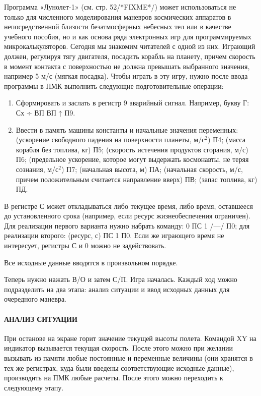 \documentclass[11pt,a4paper,oneside]{article}
\begin{document}
Программа «Лунолет-1» (см. стр. 52/*FIXME*/) может использоваться не только для численного моделирования маневров космических аппаратов в непосредственной близости безатмосферных небесных тел или в качестве учебного пособия, но и как основа ряда электронных игр для программируемых микрокалькуляторов. Сегодня мы знакомим читателей с одной из них. Играющий должен, регулируя тягу двигателя, посадить корабль на планету, причем скорость в момент контакта с поверхностью не должна превышать выбранного значения, например 5 м/с (мягкая посадка). Чтобы играть в эту игру, нужно после ввода программы в ПМК выполнить следующие подготовительные операции:
\begin{enumerate}
\item Сформировать и заслать в регистр 9 аварийный сигнал. Например, букву Г: Сх ÷ ВП ВП ↑ П9.
\item Ввести в память машины константы и начальные значения переменных: (ускорение свободного падения на поверхности планеты, м/с$^{2}$) П4; (масса корабля без топлива, кг) П5; (скорость истечения продуктов сгорания, м/с) П6; (предельное ускорение, которое могут выдержать космонавты, не теряя сознания, м/с$^{2}$) П7; (начальная высота, м) ПА; (начальная скорость, м/с, причем положительным считается направление вверх) ПВ; (запас топлива, кг) ПД.
\end{enumerate}

В регистре С может откладываться либо текущее время, либо время, оставшееся до установленного срока (например, если ресурс жизнеобеспечения ограничен). Для реализации первого варианта нужно набрать команду: 0 ПС 1 /—/ П0; для реализации второго: (ресурс, с) ПС 1 П0. Если же играющего время не интересует, регистры С и 0 можно не задействовать.

Все исходные данные вводятся в произвольном порядке.

Теперь нужно нажать В/О и затем С/П. Игра началась. Каждый ход можно подразделить на два этапа: анализ ситуации и ввод исходных данных для очередного маневра.

\paragraph{АНАЛИЗ СИТУАЦИИ}
При останове на экране горит значение текущей высоты полета. Командой XY на индикатор вызывается текущая скорость. После этого можно при желании вызывать из памяти любые постоянные и переменные величины (они хранятся в тех же регистрах, куда были введены соответствующие исходные данные), производить на ПМК любые расчеты. После этого можно переходить к следующему этапу.
\end{document}
